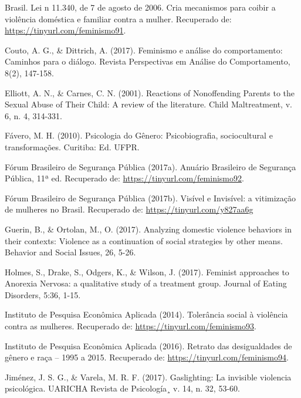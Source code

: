 \hangindent=25pt
\noindent Brasil. Lei n 11.340, de 7 de agosto de 2006. Cria mecanismos para coibir a violência doméstica e familiar contra a mulher. Recuperado de: \url{https://tinyurl.com/feminismo91}. 

\hangindent=25pt
\noindent Couto, A. G., \& Dittrich, A. (2017). Feminismo e análise do comportamento: Caminhos para o diálogo. Revista Perspectivas em Análise do Comportamento, 8(2), 147-158.

\hangindent=25pt
\noindent Elliott, A. N., \& Carnes, C. N. (2001). Reactions of Nonoffending Parents to the Sexual Abuse of Their Child: A review of the literature. Child Maltreatment, v. 6, n. 4, 314-331.

\hangindent=25pt
\noindent Fávero, M. H. (2010). Psicologia do Gênero: Psicobiografia, sociocultural e transformações. Curitiba: Ed. UFPR.

\hangindent=25pt
\noindent Fórum Brasileiro de Segurança Pública (2017a). Anuário Brasileiro de Segurança Pública, 11ª ed. Recuperado de: \url{https://tinyurl.com/feminismo92}. 

\hangindent=25pt
\noindent Fórum Brasileiro de Segurança Pública (2017b). Visível e Invisível: a vitimização de mulheres no Brasil. Recuperado de: \url{https://tinyurl.com/y827aa6g}

\hangindent=25pt
\noindent Guerin, B., \& Ortolan, M., O. (2017). Analyzing domestic violence behaviors in their contexts: Violence as a continuation of social strategies by other means. Behavior and Social Issues, 26, 5-26.

\hangindent=25pt
\noindent Holmes, S., Drake, S., Odgers, K., \& Wilson, J. (2017). Feminist approaches to Anorexia Nervosa: a qualitative study of a treatment group. Journal of Eating Disorders, 5:36, 1-15.

\hangindent=25pt
\noindent Instituto de Pesquisa Econômica Aplicada (2014). Tolerância social à violência contra as mulheres. Recuperado de: \url{https://tinyurl.com/feminismo93}. 

\hangindent=25pt
\noindent Instituto de Pesquisa Econômica Aplicada (2016). Retrato das desigualdades de gênero e raça – 1995 a 2015. Recuperado de: \url{https://tinyurl.com/feminismo94}.

\hangindent=25pt
\noindent Jiménez, J. S. G., \& Varela, M. R. F. (2017). Gaslighting: La invisible violencia psicológica. UARICHA Revista de Psicología¸ v. 14, n. 32, 53-60.

